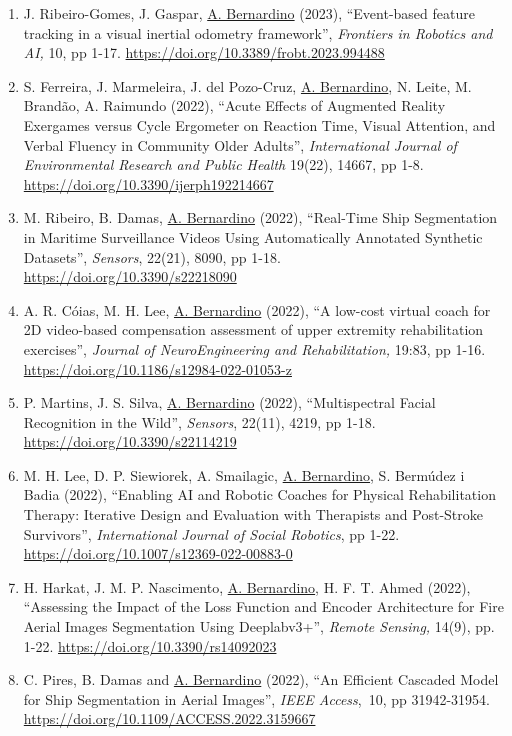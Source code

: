 \documentclass[
]{article}
\begin{document}
\begin{enumerate}
\item
  J. Ribeiro-Gomes, J. Gaspar, \ul{A. Bernardino} (2023), ``Event-based
  feature tracking in a visual inertial odometry framework'',
  \emph{Frontiers in Robotics and AI,} 10, pp 1-17.
  \url{https://doi.org/10.3389/frobt.2023.994488}
\item
  S. Ferreira, J. Marmeleira, J. del Pozo-Cruz, \ul{A. Bernardino}, N.
  Leite, M. Brandão, A. Raimundo (2022), ``Acute Effects of Augmented
  Reality Exergames versus Cycle Ergometer on Reaction Time, Visual
  Attention, and Verbal Fluency in Community Older Adults'',
  \emph{International Journal of Environmental Research and Public
  Health} 19(22), 14667, pp 1-8.
  \url{https://doi.org/10.3390/ijerph192214667}~
\item
  M. Ribeiro, B. Damas, \ul{A. Bernardino} (2022), ``Real-Time Ship
  Segmentation in Maritime Surveillance Videos Using Automatically
  Annotated Synthetic Datasets'', \emph{Sensors}, 22(21), 8090, pp 1-18.
  \url{https://doi.org/10.3390/s22218090}~~
\item
  A. R. Cóias, M. H. Lee, \ul{A. Bernardino} (2022), ``A low-cost
  virtual coach for 2D video-based compensation assessment of upper
  extremity rehabilitation exercises'', \emph{Journal of
  NeuroEngineering and Rehabilitation,} 19:83, pp 1-16.
  \url{https://doi.org/10.1186/s12984-022-01053-z}~
\item
  P. Martins, J. S. Silva, \ul{A. Bernardino} (2022), ``Multispectral
  Facial Recognition in the Wild'', \emph{Sensors}, 22(11), 4219, pp
  1-18. \url{https://doi.org/10.3390/s22114219}~
\item
  M. H. Lee, D. P. Siewiorek, A. Smailagic, \ul{A. Bernardino}, S.
  Bermúdez i Badia (2022), ``Enabling AI and Robotic Coaches for
  Physical Rehabilitation Therapy: Iterative Design and Evaluation with
  Therapists and Post-Stroke Survivors'', \emph{International Journal of
  Social Robotics}, pp 1-22.
  \url{https://doi.org/10.1007/s12369-022-00883-0}~
\item
  H. Harkat, J. M. P. Nascimento, \ul{A. Bernardino}, H. F. T. Ahmed
  (2022), ``Assessing the Impact of the Loss Function and Encoder
  Architecture for Fire Aerial Images Segmentation Using Deeplabv3+'',
  \emph{Remote Sensing,} 14(9), pp. 1-22.
  \url{https://doi.org/10.3390/rs14092023}~
\item
  C. Pires, B. Damas and \ul{A. Bernardino} (2022), ``An Efficient
  Cascaded Model for Ship Segmentation in Aerial Images'', \emph{IEEE
  Access},~10, pp 31942-31954.
  \url{https://doi.org/10.1109/ACCESS.2022.3159667}~

\end{enumerate}
\end{document}
